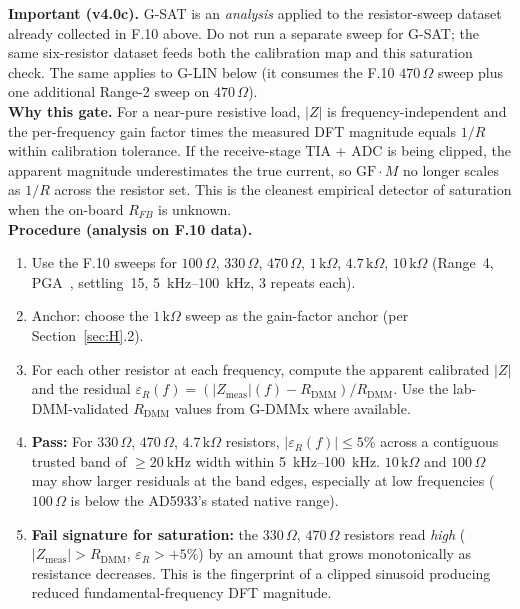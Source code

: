 \documentclass[11pt,a4paper]{article}
\newcommand{\kohm}[1]{\ensuremath{#1\,\mathrm{k}\Omega}}
\newcommand{\Rohm}[1]{\ensuremath{#1\,\Omega}}
\begin{document}
\begin{gatebox}
\textbf{Important (v4.0c).} G-SAT is an \emph{analysis} applied to the resistor-sweep dataset already collected in F.10 above. Do not run a separate sweep for G-SAT; the same six-resistor dataset feeds both the calibration map and this saturation check. The same applies to G-LIN below (it consumes the F.10 \Rohm{470} sweep plus one additional Range-2 sweep on \Rohm{470}).
\\[2pt]
\textbf{Why this gate.} For a near-pure resistive load, $|Z|$ is frequency-independent and the per-frequency gain factor times the measured DFT magnitude equals $1/R$ within calibration tolerance. If the receive-stage TIA + ADC is being clipped, the apparent magnitude underestimates the true current, so $\mathrm{GF}\cdot M$ no longer scales as $1/R$ across the resistor set. This is the cleanest empirical detector of saturation when the on-board $R_{FB}$ is unknown.
\\[2pt]
\textbf{Procedure (analysis on F.10 data).}
\begin{enumerate}
\item Use the F.10 sweeps for \Rohm{100}, \Rohm{330}, \Rohm{470}, \kohm{1}, \kohm{4.7}, \kohm{10} (Range~4, PGA~, settling~15, \SIrange{5}{100}{\kilo\hertz}, 3 repeats each).
\item Anchor: choose the \kohm{1} sweep as the gain-factor anchor (per Section~\ref{sec:H}.2).
\item For each other resistor at each frequency, compute the apparent calibrated $|Z|$ and the residual $\varepsilon_R(f) = (|Z_\mathrm{meas}|(f) - R_\mathrm{DMM})/R_\mathrm{DMM}$. Use the lab-DMM-validated $R_\mathrm{DMM}$ values from G-DMMx where available.
\item \textbf{Pass:} For \Rohm{330}, \Rohm{470}, \kohm{4.7} resistors, $|\varepsilon_R(f)| \leq 5\%$ across a contiguous trusted band of $\geq\SI{20}{\kilo\hertz}$ width within \SIrange{5}{100}{\kilo\hertz}. \kohm{10} and \Rohm{100} may show larger residuals at the band edges, especially at low frequencies (\Rohm{100} is below the AD5933's stated native range).
\item \textbf{Fail signature for saturation:} the \Rohm{330}, \Rohm{470} resistors read \emph{high} ($|Z_\mathrm{meas}| > R_\mathrm{DMM}$, $\varepsilon_R > +5\%$) by an amount that grows monotonically as resistance decreases. This is the fingerprint of a clipped sinusoid producing reduced fundamental-frequency DFT magnitude.

\end{enumerate}
\end{gatebox}
\end{document}
